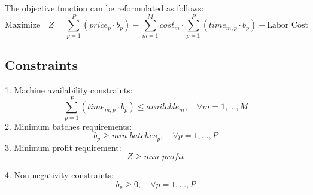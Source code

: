 \documentclass{article}
\begin{document}
The objective function can be reformulated as follows:
\[
\text{Maximize} \quad Z = \sum_{p=1}^{P} (price_{p} \cdot b_{p}) - \sum_{m=1}^{M} cost_{m} \cdot \sum_{p=1}^{P} (time_{m,p} \cdot b_{p}) - \text{Labor Cost}
\]

\subsection*{Constraints}
1. Machine availability constraints:
\[
\sum_{p=1}^{P} (time_{m,p} \cdot b_{p}) \leq available_{m}, \quad \forall m = 1, \ldots, M
\]
2. Minimum batches requirements:
\[
b_{p} \geq min\_batches_{p}, \quad \forall p = 1, \ldots, P
\]
3. Minimum profit requirement:
\[
Z \geq min\_profit
\]

4. Non-negativity constraints:
\[
b_{p} \geq 0, \quad \forall p = 1, \ldots, P
\]
\end{document}
